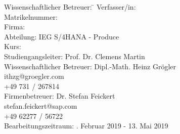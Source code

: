 \begin{titlepage}
\begin{center}
\begin{minipage}{\textwidth}
\begin{tabbing}
	Wissenschaftlicher Betreuer: \hspace{0.85cm}\=\kill
	Verfasser/in: \> \DerAutorDerArbeit \\[1.5mm]
	Matrikelnummer:  \\[1.5mm]
	Firma: \> \DerNameDerFirma  \\[1.5mm]
	Abteilung: \> IEG S/4HANA - Produce \\[1.5mm]
	Kurs: \> \DieKursbezeichnung \\[1.5mm]
	Studiengangsleiter: \> Prof. Dr. Clemens Martin  \\[1.5mm]
	Wissenschaftlicher Betreuer: \> Dipl.-Math. Heinz Grögler \\
	\> ithzg@groegler.com \\
	\> +49 731 / 267814 \\[1.5mm]
	Firmenbetreuer: \> Dr. Stefan Feickert \\
	\> stefan.feickert@sap.com \\
	\> +49 62277 / 56722 \\[1.5mm]
	Bearbeitungszeitraum: . Februar 2019 - 13. Mai 2019
\end{tabbing}
\end{minipage}

\end{center}

\end{titlepage}